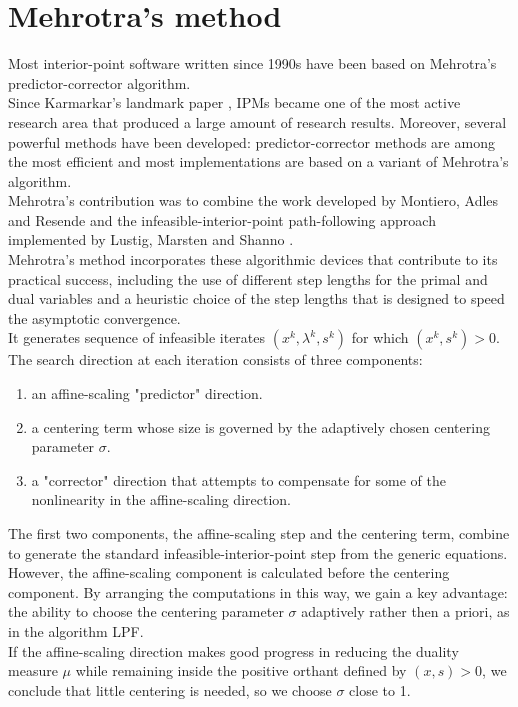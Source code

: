 \documentclass[a4paper,10 pt,titlepage,twoside]{book}
\theoremstyle{plain}
\theoremstyle{definition}
\theoremstyle{remark}
\begin{document}
\section{Mehrotra's method}
Most interior-point software written since 1990s have been based on Mehrotra's predictor-corrector algorithm.\\
Since Karmarkar's landmark paper \cite{Kar}, IPMs became one of the most active research area that produced a large amount of research results. Moreover, several powerful methods have been developed: predictor-corrector methods are among the most efficient and most implementations are based on a variant of Mehrotra's algorithm. \\
Mehrotra's contribution was to combine the work developed by Montiero, Adles and Resende \cite{MARE} and the infeasible-interior-point path-following approach implemented by Lustig, Marsten and Shanno \cite{LMS}.\\ 
Mehrotra's method incorporates these algorithmic devices that contribute to its practical success, including the use of different step lengths for the primal and dual variables and a heuristic choice of the step lengths that is designed to speed the asymptotic convergence.\\
It generates sequence of infeasible iterates $(x^{k},\lambda^{k},s^{k})$ for which $(x^{k},s^{k})>0$. The search direction at each iteration consists of three components:
\begin{enumerate}
	\item an affine-scaling "predictor" direction.
	\item a centering term whose size is governed by the adaptively chosen centering parameter $\sigma$.
	\item a "corrector" direction that attempts to compensate for some of the nonlinearity in the affine-scaling direction.
	\end{enumerate}
The first two components, the affine-scaling step and the centering term, combine to generate the standard infeasible-interior-point step from the generic equations. However, the affine-scaling component is calculated before the centering component. By arranging the computations in this way, we gain a key advantage: the ability to choose the centering parameter $\sigma$ adaptively rather then a priori, as in the algorithm LPF.\\
If the affine-scaling direction makes good progress in reducing the duality measure $\mu$ while remaining inside the positive orthant defined by $(x,s)>0$, we conclude that little centering is needed, so we choose $\sigma$ close to 1.
\end{document}
